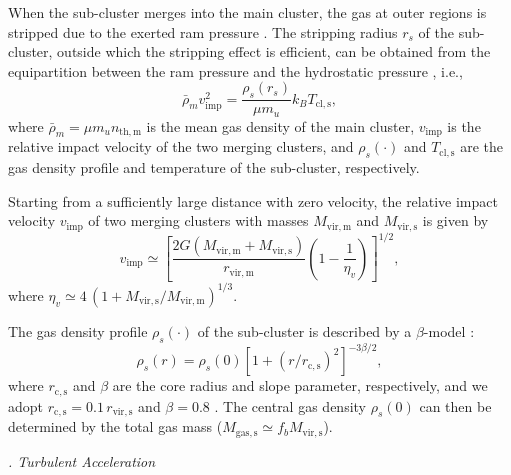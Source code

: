 \documentclass[twocolumn]{aastex62}
\newcommand{\R}[1]{\mathrm{#1}}
\newcommand{\editwip}[1]{{\leavevmode\color{magenta}#1}}
\newcounter{sssseccount}
\newcommand{\sssseclabel}{\alph{sssseccount}}
\newcommand{\ssssec}[1]{%
  \vspace{1ex}%
  \stepcounter{sssseccount}%
  \noindent\emph{\sssseclabel. #1}%
}
\begin{document}
\editwip{%
When the sub-cluster merges into the main cluster, the gas at outer regions
is stripped due to the exerted ram pressure \citep{gunn1972}.
The stripping radius $r_s$ of the sub-cluster, outside which the stripping
effect is efficient, can be obtained from the equipartition between the ram
pressure and the hydrostatic pressure \citep{cassano2005}, i.e.,
\begin{equation}
  \label{eq:rs-eqp}
  \bar{\rho}_m v_{\R{imp}}^2 = \frac{\rho_s(r_s)}{\mu m_u} k_B T_{\R{cl,s}},
\end{equation}
where
$\bar{\rho}_m = \mu m_u n_{\R{th,m}}$ is the mean gas density of the main
cluster,
$v_{\R{imp}}$ is the relative impact velocity of the two merging clusters,
and $\rho_s(\cdot)$ and $T_{\R{cl,s}}$ are the gas density profile and
temperature of the sub-cluster, respectively.

Starting from a sufficiently large distance with zero velocity,
the relative impact velocity $v_{\R{imp}}$ of two merging clusters with
masses $M_{\R{vir,m}}$ and $M_{\R{vir,s}}$ is given by
\citep{sarazin2002,cassano2005}
\begin{equation}
  \label{eq:v-imp}
  v_{\R{imp}} \simeq \left[
    \frac{2G (M_{\R{vir,m}} + M_{\R{vir,s}})}{r_{\R{vir,m}}}
    \left( 1 - \frac{1}{\eta_v} \right)\right]^{1/2},
\end{equation}
where $\eta_v \simeq 4 \,(1 + M_{\R{vir,s}}/M_{\R{vir,m}})^{1/3}$.

The gas density profile $\rho_s(\cdot)$ of the sub-cluster is described by
a $\beta$-model \citep{cavaliere1976}:
\begin{equation}
  \label{eq:beta-model}
  \rho_s(r) = \rho_s(0) \left[1 + (r / r_{\R{c,s}})^2 \right]^{-3\beta/2},
\end{equation}
where $r_{\R{c,s}}$ and $\beta$ are the core radius and slope parameter,
respectively, and we adopt $r_{\R{c,s}} = 0.1 \,r_{\R{vir,s}}$ and
$\beta = 0.8$ \citep{cassano2005}.
The central gas density $\rho_s(0)$ can then be determined by the total gas
mass ($M_{\R{gas,s}} \simeq f_b M_{\R{vir,s}}$).
} %

\ssssec{Turbulent Acceleration}
\end{document}
